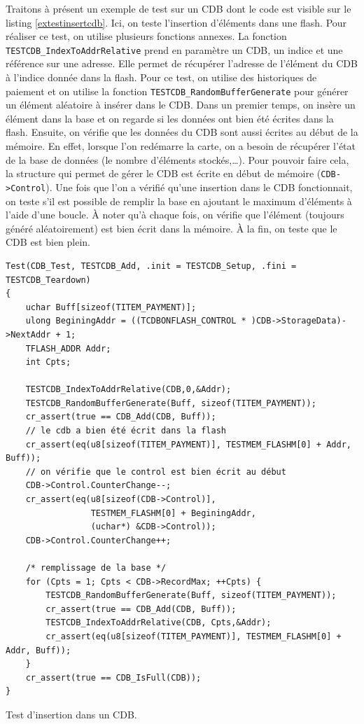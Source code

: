\documentclass[a4paper]{article}
\begin{document}
Traitons à présent un exemple de test sur un CDB dont le code est visible sur le
listing \ref{extestinsertcdb}. Ici, on teste l'insertion d'éléments dans une
flash. Pour réaliser ce test, on utilise plusieurs fonctions annexes. La
fonction \verb|TESTCDB_IndexToAddrRelative| prend en paramètre un CDB, un indice
et une référence sur une adresse. Elle permet de récupérer l'adresse de
l'élément du CDB à l'indice donnée dans la flash. Pour ce test, on utilise des
historiques de paiement et on utilise la fonction
\verb|TESTCDB_RandomBufferGenerate| pour générer un élément aléatoire à insérer
dans le CDB. Dans un premier temps, on insère un élément dans la base et on
regarde si les données ont bien été écrites dans la flash. Ensuite, on vérifie
que les données du CDB sont aussi écrites au début de la mémoire. En effet,
lorsque l'on redémarre la carte, on a besoin de récupérer l'état de la base de
données (le nombre d'éléments stockés,\dots). Pour pouvoir faire cela, la
structure qui permet de gérer le CDB est écrite en début de mémoire
(\verb|CDB->Control|). Une fois que l'on a vérifié qu'une insertion dans le CDB
fonctionnait, on teste s'il est possible de remplir la base en ajoutant le
maximum d'éléments à l'aide d'une boucle. À noter qu'à chaque fois, on vérifie
que l'élément (toujours généré aléatoirement) est bien écrit dans la mémoire. À
la fin, on teste que le CDB est bien plein.

\begin{listing}[ht!]
\begin{verbatim}
Test(CDB_Test, TESTCDB_Add, .init = TESTCDB_Setup, .fini = TESTCDB_Teardown)
{
    uchar Buff[sizeof(TITEM_PAYMENT)];
    ulong BeginingAddr = ((TCDBONFLASH_CONTROL * )CDB->StorageData)->NextAddr + 1;
    TFLASH_ADDR Addr;
    int Cpts;

    TESTCDB_IndexToAddrRelative(CDB,0,&Addr);
    TESTCDB_RandomBufferGenerate(Buff, sizeof(TITEM_PAYMENT));
    cr_assert(true == CDB_Add(CDB, Buff));
    // le cdb a bien été écrit dans la flash
    cr_assert(eq(u8[sizeof(TITEM_PAYMENT)], TESTMEM_FLASHM[0] + Addr, Buff));
    // on vérifie que le control est bien écrit au début
    CDB->Control.CounterChange--;
    cr_assert(eq(u8[sizeof(CDB->Control)],
                 TESTMEM_FLASHM[0] + BeginingAddr,
                 (uchar*) &CDB->Control));
    CDB->Control.CounterChange++;

    /* remplissage de la base */
    for (Cpts = 1; Cpts < CDB->RecordMax; ++Cpts) {
        TESTCDB_RandomBufferGenerate(Buff, sizeof(TITEM_PAYMENT));
        cr_assert(true == CDB_Add(CDB, Buff));
        TESTCDB_IndexToAddrRelative(CDB, Cpts,&Addr);
        cr_assert(eq(u8[sizeof(TITEM_PAYMENT)], TESTMEM_FLASHM[0] + Addr, Buff));
    }
    cr_assert(true == CDB_IsFull(CDB));
}
\end{verbatim}
\caption{Test d'insertion dans un CDB.}
\label{extestinsertcdb}
\end{listing}
\end{document}
